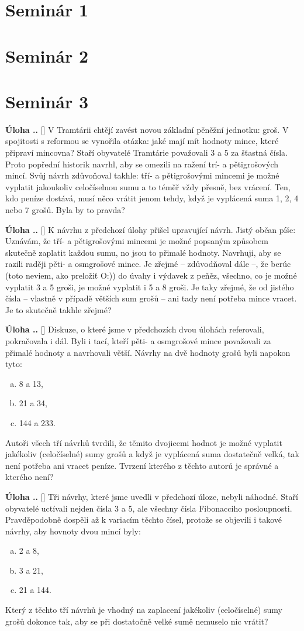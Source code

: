 \documentclass{article}
\newcounter{seminar}
\newcounter{problem}
\newcommand{\seminar}[1]{
  \clearpage
  \setcounter{seminar}{#1}
  \setcounter{problem}{0}
  \section*{Seminár #1}
}
\newcommand{\problem}[3]{
  \stepcounter{problem}
  \noindent\textbf{Úloha \theseminar .\theproblem.}
    [#1] #2
  \noindent#3
  \bigskip
}
\begin{document}
\seminar{1}

\seminar{2}

\seminar{3}

\problem{}{
V Tramtárii chtějí zavést novou základní pěněžní jednotku: groš. V spojitosti s reformou se vynořila otázka: jaké mají mít hodnoty mince, které připraví mincovna? Staří obyvatelé Tramtárie považovali 3 a 5 za šťastná čísla. Proto popřední historik navrhl, aby se omezili na ražení trí- a pětigrošových mincí. Svůj návrh zdůvoňoval takhle: tří- a pětigrošovými mincemi je možné vyplatit jakoukoliv celočíselnou sumu a to téměř vždy přesně, bez vrácení. Ten, kdo peníze dostává, musí něco vrátit jenom tehdy, když je vyplácená suma 1, 2, 4 nebo 7 grošů. Byla by to pravda?
}{
}

\problem{}{
K návrhu z předchozí úlohy přišel upravující návrh. Jistý občan píše: Uznávám, že tří- a pětigrošovými mincemi je možné popsaným způsobem skutečně zaplatit každou sumu, no jsou to přimalé hodnoty. Navrhuji, aby se razili raději pěti- a osmgrošové mince. Je zřejmé -- zdůvodňoval dále --, že berúc (toto neviem, ako preložiť O:)) do úvahy i výdavek z peňěz, všechno, co je možné vyplatit 3 a 5 groši, je možné vyplatit i 5 a 8 groši. Je taky zřejmé, že od jistého čísla -- vlastně v případě větších sum grošů -- ani tady není potřeba mince vracet. Je to skutečně takhle zřejmé?
}{
}

\problem{}{
Diskuze, o které jsme v předchozích dvou úlohách referovali, pokračovala i dál. Byli i tací, kteří pěti- a osmgrošové mince považovali za přimalé hodnoty a navrhovali větší. Návrhy na dvě hodnoty grošů byli napokon tyto:
\begin{enumerate}[a)]
\item 8 a 13,
\item 21 a 34,
\item 144 a 233.
\end{enumerate}
Autoři všech tří návrhů tvrdili, že těmito dvojicemi hodnot je možné vyplatit jakékoliv (celočíselné) sumy grošů a když je vyplácená suma dostatečně velká, tak není potřeba ani vracet peníze. Tvrzení kterého z těchto autorú je správné a kterého není?
}{
}

\problem{}{
Tři návrhy, které jsme uvedli v předchozí úloze, nebyli náhodné. Staří obyvatelé uctívali nejden čísla 3 a 5, ale všechny čísla Fibonacciho posloupnosti. Pravděpodobně dospěli až k variacím těchto čísel, protože se objevili i takové návrhy, aby hovnoty dvou mincí byly:
\begin{enumerate}[a)]
\item 2 a 8,
\item 3 a 21,
\item 21 a 144.
\end{enumerate}
Který z těchto tří návrhů je vhodný na zaplacení jakékoliv (celočíselné) sumy grošů dokonce tak, aby se při dostatočně velké sumě nemuselo nic vrátit?
}{
}
\end{document}
